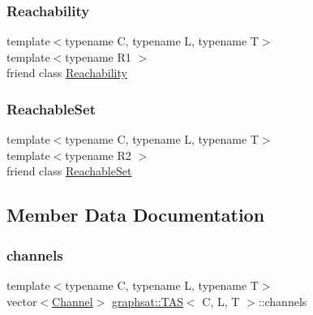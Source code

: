 \subsubsection{\texorpdfstring{Reachability}{Reachability}}
{\footnotesize\ttfamily template$<$typename C, typename L, typename T$>$ \\
template$<$typename R1 $>$ \\
friend class \mbox{\hyperlink{classgraphsat_1_1_reachability}{Reachability}}\hspace{0.3cm}{\ttfamily [friend]}}

\mbox{\label{classgraphsat_1_1_t_a_s_a8e8eb523736892bc0c9b460e370db614}} 
\subsubsection{\texorpdfstring{ReachableSet}{ReachableSet}}
{\footnotesize\ttfamily template$<$typename C, typename L, typename T$>$ \\
template$<$typename R2 $>$ \\
friend class \mbox{\hyperlink{classgraphsat_1_1_reachable_set}{Reachable\+Set}}\hspace{0.3cm}{\ttfamily [friend]}}



\subsection{Member Data Documentation}
\mbox{\label{classgraphsat_1_1_t_a_s_a5d81d02db63026ccb83f363b8f93d006}} 
\subsubsection{\texorpdfstring{channels}{channels}}
{\footnotesize\ttfamily template$<$typename C, typename L, typename T$>$ \\
vector$<$\mbox{\hyperlink{structgraphsat_1_1_channel}{Channel}}$>$ \mbox{\hyperlink{classgraphsat_1_1_t_a_s}{graphsat\+::\+T\+AS}}$<$ C, L, T $>$\+::channels\hspace{0.3cm}{\ttfamily [private]}}

